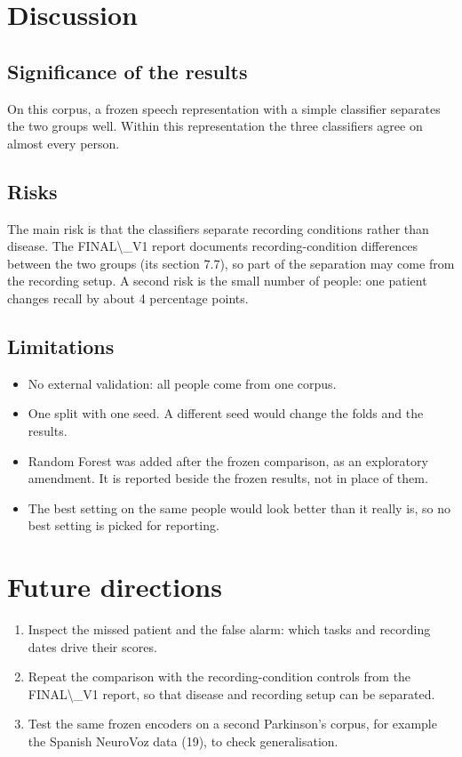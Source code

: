 \documentclass[11pt,a4paper]{article}
\begin{document}
\section{Discussion}\label{sec:discussion}
\subsection{Significance of the results}\label{sec:significance}
On this corpus, a frozen speech representation with a simple classifier separates the two groups well. Within this representation the three classifiers agree on almost every person.

\subsection{Risks}\label{sec:risks}
The main risk is that the classifiers separate recording conditions rather than disease. The FINAL\textbackslash{}\_V1 report documents recording-condition differences between the two groups (its section 7.7), so part of the separation may come from the recording setup. A second risk is the small number of people: one patient changes recall by about 4 percentage points.

\subsection{Limitations}\label{sec:limitations}
\begin{itemize}\item No external validation: all people come from one corpus.
\item One split with one seed. A different seed would change the folds and the results.
\item Random Forest was added after the frozen comparison, as an exploratory amendment. It is reported beside the frozen results, not in place of them.
\item The best setting on the same people would look better than it really is, so no best setting is picked for reporting.
\end{itemize}
\section{Future directions}\label{sec:future}
\begin{enumerate}\item Inspect the missed patient and the false alarm: which tasks and recording dates drive their scores.
\item Repeat the comparison with the recording-condition controls from the FINAL\textbackslash{}\_V1 report, so that disease and recording setup can be separated.
\item Test the same frozen encoders on a second Parkinson's corpus, for example the Spanish NeuroVoz data (19), to check generalisation.
\end{enumerate}
\end{document}
